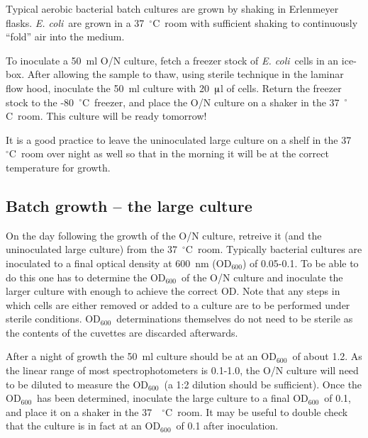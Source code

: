 \documentclass[a4paper]{article}
\newcommand{\dc}{~$^{\circ}$C}
\newcommand{\ec}{\textit{E. coli}}
\newcommand{\micro}{$\muup$}
\newcommand{\od}{OD$_{600}$}
\begin{document}
\begin{multicols}{2}
Typical aerobic bacterial batch cultures are grown by
shaking in Erlenmeyer flasks. \ec\ are grown in a 37\dc\ room with sufficient
shaking to continuously ``fold'' air into the medium.

To inoculate a 50~ml O/N culture, fetch a freezer stock of \ec\ cells in an
ice-box. After allowing the sample to thaw, using sterile technique in the
laminar flow hood, inoculate the 50~ml culture with 20~\micro l of cells.
Return the freezer stock to the -80\dc\ freezer, and place the O/N culture on a
shaker in the 37\dc\ room. This culture will be ready tomorrow!

It is a good practice to leave the uninoculated large culture on a shelf in the
37~\dc\ room over night as well so that in the morning it will be at the
correct temperature for growth.


\subsection{Batch growth -- the large culture}

On the day following the growth of the O/N culture, retreive it (and the
uninoculated large culture) from the 37\dc\ room. Typically bacterial cultures
are inoculated to a final optical density at 600~nm (\od) of 0.05-0.1. To be
able to do this one has to determine the \od\ of the O/N culture and inoculate
the larger culture with enough to achieve the correct OD. Note that any steps
in which cells are either removed or added to a culture are to be performed
under sterile conditions. \od\ determinations themselves do not need to be
sterile as the contents of the cuvettes are discarded afterwards.

After a night of growth the 50~ml culture should be at an \od\ of about 1.2. As
the linear range of most spectrophotometers is 0.1-1.0, the O/N culture will
need to be diluted to measure the \od\ (a 1:2 dilution should be sufficient).
Once the \od\ has been determined, inoculate the large culture to a final \od\
of 0.1, and place it on a shaker in the 37~\dc\ room. It may be useful to
double check that the culture is in fact at an \od\ of 0.1 after inoculation.


\end{multicols}
\end{document}

